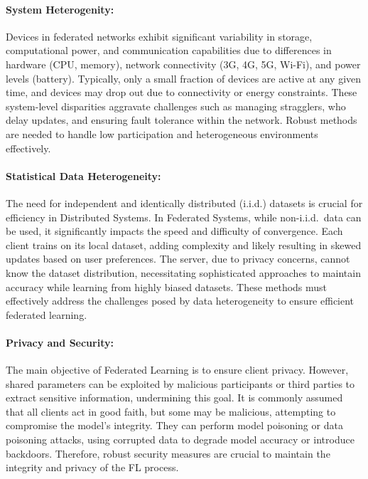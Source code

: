 \paragraph{System Heterogenity:} Devices in federated networks exhibit significant variability in storage, computational power, and communication
capabilities due to differences in hardware (CPU, memory), network connectivity (3G, 4G, 5G, Wi-Fi), and power levels (battery). Typically, only
a small fraction of devices are active at any given time, and devices may drop out due to connectivity or energy constraints. These system-level
disparities aggravate challenges such as managing stragglers, who delay updates, and ensuring fault tolerance within the network. Robust methods
are needed to handle low participation and heterogeneous environments effectively.
\paragraph{Statistical Data Heterogeneity:} The need for independent and identically distributed (i.i.d.) datasets is crucial for efficiency in Distributed
Systems. In Federated Systems, while non-i.i.d.\ data can be used, it significantly impacts the speed and difficulty of convergence. Each client trains
on its local dataset, adding complexity and likely resulting in skewed updates based on user preferences. The server, due to privacy concerns, cannot
know the dataset distribution, necessitating sophisticated approaches to maintain accuracy while learning from highly biased datasets. These methods
must effectively address the challenges posed by data heterogeneity to ensure efficient federated learning.
\paragraph{Privacy and Security:} The main objective of Federated Learning is to ensure client privacy. However, shared parameters can be exploited by
malicious participants or third parties to extract sensitive information, undermining this goal. It is commonly assumed that all clients act in good faith,
but some may be malicious, attempting to compromise the model's integrity. They can perform model poisoning or data poisoning attacks, using corrupted data
to degrade model accuracy or introduce backdoors. Therefore, robust security measures are crucial to maintain the integrity and privacy of the FL process.

